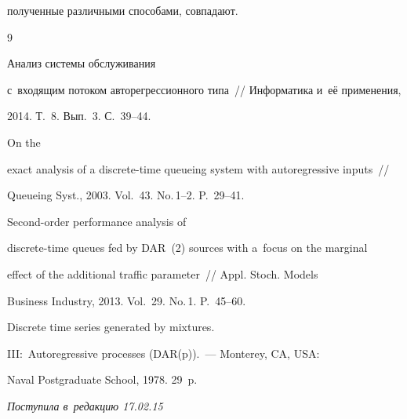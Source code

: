 полученные различными способами, совпадают.



{\small\frenchspacing

{%


\begin{thebibliography}{9}


 Анализ системы обслуживания

с~входящим потоком авторегрессионного типа~/\!\!/ Информатика и~её применения,

2014. Т.~8. Вып.~3. С.~39--44.


 On the

exact analysis of a discrete-time queueing system with autoregressive inputs~/\!\!/

Queueing Syst., 2003. Vol.~43. No.\,1--2. P.~29--41.


 Second-order performance analysis of

discrete-time queues fed by DAR~(2) sources with a~focus on the marginal

effect of the additional traffic parameter~/\!\!/ Appl. Stoch. Models

Business Industry, 2013. Vol.~29. No.\,1. P.~45--60.


 Discrete time series generated by mixtures.

III:~Autoregressive processes (DAR(p)).~--- Monterey, CA, USA:

Naval Postgraduate School, 1978. 29~p.

\end{thebibliography}

} }





\vspace*{-3pt}



\hfill{\small\textit{Поступила в~редакцию 17.02.15}}








